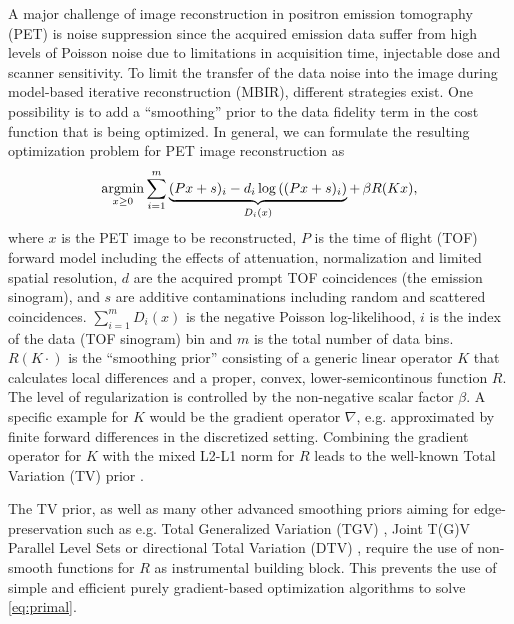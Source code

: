 A major challenge of image reconstruction in positron emission tomography (PET)
is noise suppression since the acquired emission data suffer from high levels of Poisson
noise due to limitations in acquisition time, injectable dose and scanner sensitivity.
To limit the transfer of the data noise into the image during model-based iterative
reconstruction (MBIR), different strategies exist. 
One possibility is to add a ``smoothing'' prior to the data fidelity term in the cost
function that is being optimized.
In general, we can formulate the resulting optimization problem for PET image reconstruction as
%
\begin{equation}
\operatorname*{argmin} _{x\geq 0} \sum_{i=1}^{m} \underbrace{(Px + s)_i -  d_i \log \left( (Px + s)_i \right)}_{D_i(x)} + \, \beta R(Kx),
\label{eq:primal}
\end{equation}
%
where $x$ is the PET image to be reconstructed, $P$ is the time of flight (TOF) 
forward model including the effects
of attenuation, normalization and limited spatial resolution, $d$ are the 
acquired prompt TOF coincidences (the emission sinogram), 
and $s$ are additive contaminations including random and scattered coincidences. 
$\sum_{i=1}^m D_i(x)$ is the negative Poisson log-likelihood, $i$ is the index of the data (TOF sinogram)
bin and $m$ is the total number of data bins.
$R(K\cdot)$ is the ``smoothing prior'' consisting of a generic linear operator $K$ that calculates 
local differences and a proper, convex, lower-semicontinous function $R$.
The level of regularization is controlled by the non-negative scalar factor $\beta$.
A specific example for $K$ would be the gradient operator $\nabla$, e.g. approximated by finite forward 
differences in the discretized setting.
Combining the gradient operator for $K$ with the mixed L2-L1 norm for $R$ leads to the well-known 
Total Variation (TV) prior \cite{Rudin1992}.

The TV prior, as well as many other advanced smoothing priors aiming for edge-preservation 
such as e.g. Total Generalized Variation (TGV) 
\cite{Bredies2010}, Joint T(G)V \cite{Rigie2015,Knoll2016}
Parallel Level Sets \cite{Ehrhardt2016a,Schramm2017} or directional Total Variation (DTV)
\cite{Ehrhardt2016}, require the use of non-smooth functions for $R$ as instrumental building block.
This prevents the use of simple and efficient 
purely gradient-based optimization algorithms to solve \eqref{eq:primal}.



